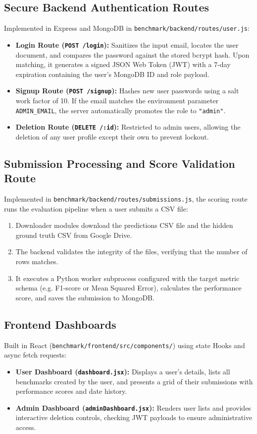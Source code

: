 \documentclass[12pt,a4paper,oneside]{report}
\newcommand{\modulepath}[1]{\texttt{#1}}
\begin{document}
\subsection{Secure Backend Authentication Routes}
Implemented in Express and MongoDB in \modulepath{benchmark/backend/routes/user.js}:
\begin{itemize}[leftmargin=*]
    \item \textbf{Login Route (\texttt{POST /login}):} Sanitizes the input email, locates the user document, and compares the password against the stored bcrypt hash. Upon matching, it generates a signed JSON Web Token (JWT) with a 7-day expiration containing the user's MongoDB ID and role payload.
    \item \textbf{Signup Route (\texttt{POST /signup}):} Hashes new user passwords using a salt work factor of 10. If the email matches the environment parameter \texttt{ADMIN\_EMAIL}, the server automatically promotes the role to \texttt{"admin"}.
    \item \textbf{Deletion Route (\texttt{DELETE /:id}):} Restricted to admin users, allowing the deletion of any user profile except their own to prevent lockout.
\end{itemize}

\subsection{Submission Processing and Score Validation Route}
Implemented in \modulepath{benchmark/backend/routes/submissions.js}, the scoring route runs the evaluation pipeline when a user submits a CSV file:
\begin{enumerate}
    \item Downloader modules download the predictions CSV file and the hidden ground truth CSV from Google Drive.
    \item The backend validates the integrity of the files, verifying that the number of rows matches.
    \item It executes a Python worker subprocess configured with the target metric schema (e.g. F1-score or Mean Squared Error), calculates the performance score, and saves the submission to MongoDB.
\end{enumerate}

\subsection{Frontend Dashboards}
Built in React (\modulepath{benchmark/frontend/src/components/}) using state Hooks and async fetch requests:
\begin{itemize}[leftmargin=*]
    \item \textbf{User Dashboard (\texttt{dashboard.jsx}):} Displays a user's details, lists all benchmarks created by the user, and presents a grid of their submissions with performance scores and date history.
    \item \textbf{Admin Dashboard (\texttt{adminDashboard.jsx}):} Renders user lists and provides interactive deletion controls, checking JWT payloads to ensure administrative access.
\end{itemize}
\end{document}
